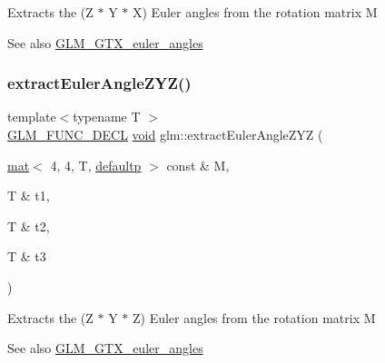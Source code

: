 Extracts the (Z $\ast$ Y $\ast$ X) Euler angles from the rotation matrix M \begin{DoxySeeAlso}{See also}
\mbox{\hyperlink{group__gtx__euler__angles}{G\+L\+M\+\_\+\+G\+T\+X\+\_\+euler\+\_\+angles}} 
\end{DoxySeeAlso}
\mbox{\label{group__gtx__euler__angles_gafdfa880a64b565223550c2d3938b1aeb}} 
\subsubsection{\texorpdfstring{extract\+Euler\+Angle\+Z\+Y\+Z()}{extractEulerAngleZYZ()}}
{\footnotesize\ttfamily template$<$typename T $>$ \\
\mbox{\hyperlink{setup_8hpp_ab2d052de21a70539923e9bcbf6e83a51}{G\+L\+M\+\_\+\+F\+U\+N\+C\+\_\+\+D\+E\+CL}} \mbox{\hyperlink{_s_d_l__opengles2__gl2ext_8h_ae5d8fa23ad07c48bb609509eae494c95}{void}} glm\+::extract\+Euler\+Angle\+Z\+YZ (\begin{DoxyParamCaption}\item[{\mbox{\hyperlink{structglm_1_1mat}{mat}}$<$ 4, 4, T, \mbox{\hyperlink{namespaceglm_a36ed105b07c7746804d7fdc7cc90ff25a9d21ccd8b5a009ec7eb7677befc3bf51}{defaultp}} $>$ const \&}]{M,  }\item[{T \&}]{t1,  }\item[{T \&}]{t2,  }\item[{T \&}]{t3 }\end{DoxyParamCaption})}

Extracts the (Z $\ast$ Y $\ast$ Z) Euler angles from the rotation matrix M \begin{DoxySeeAlso}{See also}
\mbox{\hyperlink{group__gtx__euler__angles}{G\+L\+M\+\_\+\+G\+T\+X\+\_\+euler\+\_\+angles}} 
\end{DoxySeeAlso}
\mbox{\label{group__gtx__euler__angles_gae16738a9f1887cf4e4db6a124637608d}} 
